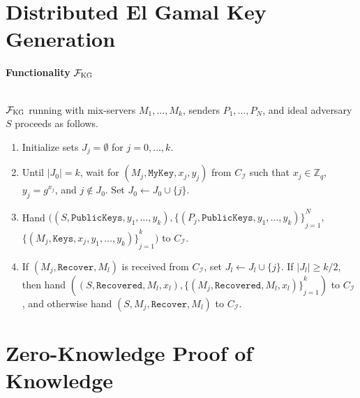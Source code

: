 \documentclass[a4paper]{article}
\newcommand{\F}{\mathcal{F}}
\begin{document}


\section{Distributed El Gamal Key Generation~\cite{wikstrom2004universally}}

\begin{framed}
    \centerline{\textbf{Functionality} $\F_{\textsc{KG}}$}
    \ \\
    \noindent $\F_{\textsc{KG}}$ running with mix-servers $M_1, \ldots, M_k$, senders $P_1, \ldots, P_N$, and ideal adversary $S$ proceeds as follows.
    
    \begin{enumerate}
        \item Initialize sets $J_j = \emptyset$ for $j = 0, \ldots, k$.
        \item Until $|J_0| = k$, wait for $(M_j, \texttt{MyKey}, x_j, y_j)$ from $C_\mathcal{I}$ such that $x_j \in \mathbb{Z}_q$, $y_j = g^{x_j}$, and $j \not \in J_0$. Set $J_0 \leftarrow J_0 \cup \{j\}$.
        \item Hand $((S, \texttt{PublicKeys}, y_1, \ldots, y_k), {\{(P_j, \texttt{PublicKeys}, y_1, \ldots, y_k)\}}^{N}_{j=1},$ ${\{(M_j, \texttt{Keys}, x_j, y_1, \ldots, y_k)\}}^{k}_{j=1})$ to $C_\mathcal{I}$.
        \item If $(M_j, \texttt{Recover}, M_l)$ is received from $C_\mathcal{I}$, set $J_l \leftarrow J_l \cup \{j\}$. If $|J_l| \geq k/2$, then hand $((S, \texttt{Recovered}, M_l, x_l), {\{(M_j, \texttt{Recovered}, M_l, x_l)\}}^{k}_{j=1})$ to $C_\mathcal{I}$, and otherwise hand $(S, M_j, \texttt{Recover}, M_l)$ to $C_\mathcal{I}$.
    \end{enumerate}
\end{framed}


\section{Zero-Knowledge Proof of Knowledge~\cite{wikstrom2004universally}}
\end{document}
